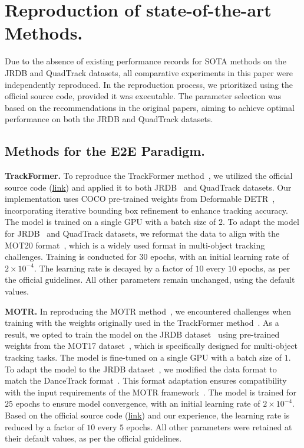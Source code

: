 \section{Reproduction of state-of-the-art Methods.}
Due to the absence of existing performance records for SOTA methods on the JRDB and QuadTrack datasets, all comparative experiments in this paper were independently reproduced. In the reproduction process, we prioritized using the official source code, provided it was executable. The parameter selection was based on the recommendations in the original papers, aiming to achieve optimal performance on both the JRDB and QuadTrack datasets.

\subsection{Methods for the E2E Paradigm.}

\noindent\textbf{TrackFormer.}
To reproduce the TrackFormer method~\cite{meinhardt2021trackformer}, we utilized the official source code (\href{https://github.com/timmeinhardt/trackformer}{link}) and applied it to both JRDB~\cite{martin2021jrdb} and QuadTrack datasets.
Our implementation uses COCO pre-trained weights from Deformable DETR~\cite{zhu2020deformable}, incorporating iterative bounding box refinement to enhance tracking accuracy. The model is trained on a single GPU with a batch size of $2$. 
To adapt the model for JRDB~\cite{martin2021jrdb} and QuadTrack datasets, we reformat the data to align with the MOT20 format~\cite{dendorfer2020mot20}, which is a widely used format in multi-object tracking challenges. 
Training is conducted for $30$ epochs, with an initial learning rate of \( 2 {\times} 10^{-4} \). The learning rate is decayed by a factor of $10$ every $10$ epochs, as per the official guidelines.
All other parameters remain unchanged, using the default values.

\noindent\textbf{MOTR.} 
In reproducing the MOTR method~\cite{zeng2022motr}, we encountered challenges when training with the weights originally used in the TrackFormer method~\cite{meinhardt2021trackformer}. 
As a result, we opted to train the model on the JRDB dataset~\cite{martin2021jrdb} using pre-trained weights from the MOT17 dataset~\cite{milan2016mot16}, which is specifically designed for multi-object tracking tasks.
The model is fine-tuned on a single GPU with a batch size of $1$. 
To adapt the model to the JRDB dataset~\cite{martin2021jrdb}, we modified the data format to match the DanceTrack format~\cite{peize2021dance}. This format adaptation ensures compatibility with the input requirements of the MOTR framework~\cite{zeng2022motr}. The model is trained for $25$ epochs to ensure model convergence, with an initial learning rate of \( 2 {\times} 10^{-4} \). 
Based on the official source code (\href{https://github.com/megvii-research/MOTR}{link}) and our experience, the learning rate is reduced by a factor of $10$ every $5$ epochs.
All other parameters were retained at their default values, as per the official guidelines.

